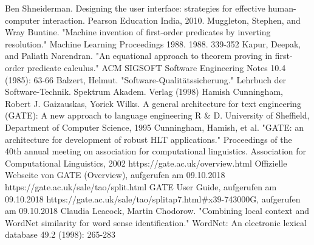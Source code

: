 \documentclass[12pt]{report}
\begin{document}
\begin{thebibliography}{20}
Ben Shneiderman. Designing the user interface: strategies for effective human-computer interaction. Pearson Education India, 2010.
Muggleton, Stephen, and Wray Buntine. "Machine invention of first-order predicates by inverting resolution." Machine Learning Proceedings 1988. 1988. 339-352
Kapur, Deepak, and Paliath Narendran. "An equational approach to theorem proving in first-order predicate calculus." ACM SIGSOFT Software Engineering Notes 10.4 (1985): 63-66
Balzert, Helmut. "Software-Qualitätssicherung." Lehrbuch der Software-Technik. Spektrum Akadem. Verlag (1998)
 Hamish Cunningham, Robert J. Gaizauskas, Yorick Wilks. A general architecture for text engineering (GATE): A new approach to language engineering R \& D. University of Sheffield, Department of Computer Science, 1995
 Cunningham, Hamish, et al. "GATE: an architecture for development of robust HLT applications." Proceedings of the 40th annual meeting on association for computational linguistics. Association for Computational Linguistics, 2002
 https://gate.ac.uk/overview.html Offizielle Webseite von GATE (Overview), aufgerufen am 09.10.2018
 https://gate.ac.uk/sale/tao/split.html GATE User Guide, aufgerufen am 09.10.2018
 https://gate.ac.uk/sale/tao/splitap7.html\#x39-743000G, aufgerufen am 09.10.2018
Claudia Leacock, Martin Chodorow. "Combining local context and WordNet similarity for word sense identification." WordNet: An electronic lexical database 49.2 (1998): 265-283
\end{thebibliography}
\end{document}
